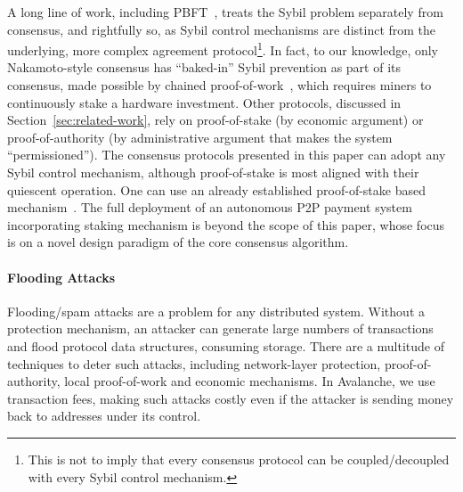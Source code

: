 \documentclass[letterpaper,twocolumn,10pt]{article}
\theoremstyle{definition}
\begin{document}
A long line of work, including PBFT~\cite{castro1999practical}, treats the Sybil problem separately from consensus, and rightfully so, as Sybil control mechanisms are distinct from the underlying, more complex agreement protocol\footnote{This is not to imply that every consensus protocol can be coupled/decoupled with every Sybil control mechanism.}.
In fact, to our knowledge, only Nakamoto-style consensus has ``baked-in'' Sybil prevention as part of its consensus, made possible by chained proof-of-work~\cite{aspnes2005exposing}, which requires miners to continuously stake a hardware investment.
Other protocols, discussed in Section~\ref{sec:related-work}, rely on proof-of-stake (by economic argument) or proof-of-authority (by administrative argument that makes the system ``permissioned'').
The consensus protocols presented in this paper can adopt any
Sybil control mechanism, although proof-of-stake is most aligned with their quiescent operation.
One can use an already established proof-of-stake based mechanism~\cite{GiladHMVZ17}.
The full deployment of an autonomous P2P payment system incorporating staking mechanism is beyond the scope of this paper, whose focus is on a novel design paradigm of the core consensus algorithm.


\paragraph{Flooding Attacks}
Flooding/spam attacks are a problem for any distributed system. 
Without a protection mechanism, an attacker can generate large numbers of transactions and flood protocol data structures, consuming storage.
There are a multitude of techniques to deter such attacks, including network-layer protection, proof-of-authority, local proof-of-work and economic mechanisms. 
In Avalanche, we use transaction fees, making such attacks costly even if the attacker is sending money back to addresses under its control.
\end{document}
